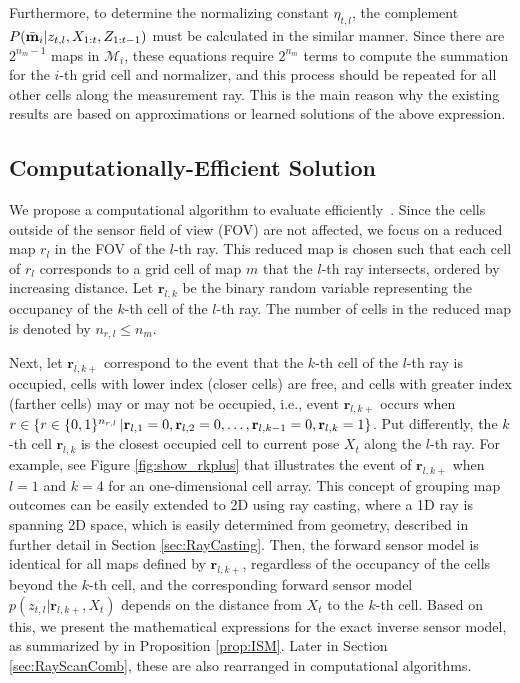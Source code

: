 Furthermore, to determine the normalizing constant $\eta_{t,l}$, the complement $\\P(\bar{\mathbf{m}}_i|z_{t,l},X_{1:t},Z_{1:t-1})$ must be calculated in the similar manner. Since there are $2^{n_{m}-1}$ maps in $\mathcal{M}_i$, these equations require $2^{n_m}$ terms to compute the summation for the $i$-th grid cell and normalizer, and this process should be repeated for all other cells along the measurement ray. This is the main reason why the existing results are based on approximations or learned solutions of the above expression. 

\subsection{Computationally-Efficient Solution}

We propose a computational algorithm to evaluate  efficiently~\cite{KauLeeAiMos16,KauTakAiLee17}. 
Since the cells outside of the sensor field of view (FOV) are not affected, we focus on a reduced map $r_l$ in the FOV of the $l$-th ray. This reduced map is chosen such that each cell of $r_l$ corresponds to a grid cell of map $m$ that the $l$-th ray intersects, ordered by increasing distance. Let $\mathbf{r}_{l,k}$ be the binary random variable representing the occupancy of the $k$-th cell of the $l$-th ray. The number of cells in the reduced map is denoted by $n_{r,l}\leq n_m$.

Next, let $\mathbf{r}_{l,k+}$ correspond to the event that the $k$-th cell of the $l$-th ray is occupied, cells with lower index (closer cells) are free, and cells with greater index (farther cells) may or may not be occupied, i.e., event $\mathbf{r}_{l,k+}$ occurs when \\$r\in\left\{ r\in\{0,1\}^{{n_{r,l}}}\,|\mathbf{r}_{l,1}=0,\mathbf{r}_{l,2}=0,\ldots,\mathbf{r}_{l,k-1}=0,\mathbf{r}_{l,k}=1 \right\}$. Put differently, the $k$-th cell $\mathbf{r}_{l,k}$ is the closest occupied cell to current pose $X_t$ along the $l$-th ray. For example, see Figure \ref{fig:show_rkplus} that illustrates the event of $\mathbf{r}_{l,k+}$ when $l=1$ and $k=4$ for an one-dimensional cell array. This concept of grouping map outcomes can be easily extended to 2D using ray casting, where a 1D ray is spanning 2D space, which is easily determined from geometry, described in further detail in Section \ref{sec:RayCasting}. Then, the forward sensor model is identical for all maps defined by $\mathbf{r}_{l,k+}$, regardless of the occupancy of the cells beyond the $k$-th cell, and the corresponding forward sensor model $p(z_{t,l}|\mathbf{r}_{l,k+},X_{t})$ depends on the distance from $X_t$ to the $k$-th cell. Based on this, we present the mathematical expressions for the exact inverse sensor model, as summarized by  in Proposition \ref{prop:ISM}. Later in Section \ref{sec:RayScanComb}, these are also rearranged in computational algorithms. 



